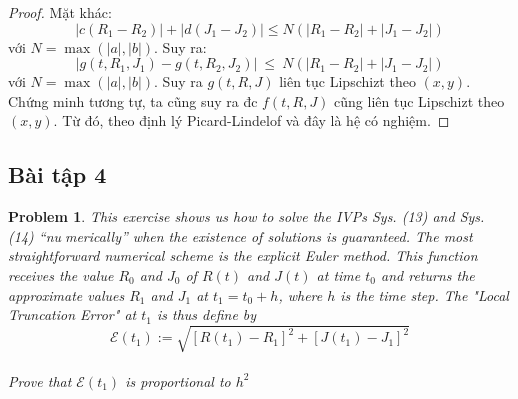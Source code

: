 \documentclass[a4paper]{article}
\newtheorem*{problem}{Problem}
\begin{document}
\begin{proof}
Mặt khác: 
  $$|c(R_1-R_2)|+|d(J_1-J_2)|  \leqslant N  (|R_1-R_2| + |J_1-J_2|)$$
  với $N = \max (\vert a \vert, \vert b \vert).$
Suy ra: 
$$|g( t,R_{1} ,J_{1}) -g( t,R_{2} ,J_{2}) |\ \leqslant \ N  (|R_1-R_2| + |J_1-J_2|)$$ 
với $N = \max (\vert a \vert, \vert b \vert).$ Suy ra $g(t,R,J)$ liên tục Lipschizt theo $(x,y)$.
\newline
Chứng minh tương tự, ta cũng suy ra đc $f(t,R,J)$ cũng liên tục Lipschizt theo $(x,y)$. Từ đó, theo định lý Picard-Lindelof và đây là hệ có nghiệm.
\end{proof}
\subsection{Bài tập 4}
\begin{problem}
    This exercise shows us how to solve the IVPs Sys. (13) and Sys. (14) “numerically” when the existence of solutions is guaranteed. The most straightforward numerical scheme
is the explicit Euler method.
    This function receives the value $R_0$ and $J_0$ of $R(t)$ and $J(t)$ at time $t_0$ and returns the approximate values $R_1$ and $J_1$ at $t_1 = t_0 + h$, where $h$ is the time step. The "Local Truncation Error" at $t_1$ is thus define by 
    $$\mathcal{E}(t_1) := \sqrt{[R(t_1) - R_1]^2 + [J(t_1) - J_1]^2}$$ \\
    Prove that $\mathcal{E}(t_1)$ is proportional to $h^2$
\end{problem}
\end{document}
